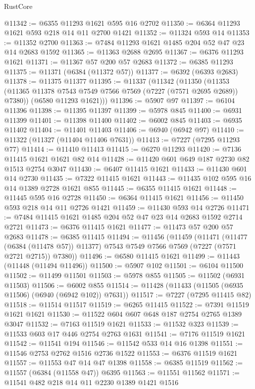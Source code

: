 \begin{lexlean}{RustCore}
\begin{coremodule}
@11342 := @6355 @11293 @1621 @595 @16 @2702
@11350 := @6364 @11293 @1621 @593 @218 @14 @11 @2700 @1421
@11352 := @11324 @593 @14
@11353 := @11352 @2700
@11363 := @7484 @11293 @1621 @1485 @204 @52 @47 @23 @14 @2683 @1592
@11365 := @11363 @2688 @2695
@11367 := @6376 @11293 @1621
@11371 := @11367 @57 @200 @57 @2683
@11372 := @6385 @11293
@11375 := @11371 (@6384 (@11372 @57))
@11377 := @6392 (@6393 @2683)
@11378 := @11375 @11377
@11395 := @11337
    (@11342
      (@11350
        (@11353 (@11365 @11378 @7543 @7549 @7566 @7569 (@7227 (@7571 @2695 @2689)) @7380))
        (@6580 @11293 @1621)))
@11396 := @5907 @97
@11397 := @6104 @11396
@11398 := @11395 @11397
@11399 := @5978 @845
@11400 := @6931 @11399
@11401 := @11398 @11400
@11402 := @6002 @845
@11403 := @6935 @11402
@11404 := @11401 @11403
@11406 := @6940 (@6942 @97)
@11410 := @11322 (@11327 (@11404 @11406 @7631))
@11413 := @7227 (@7295 @11293 @77)
@11414 := @11410 @11413
@11415 := @6270 @11293
@11420 := @7136 @11415 @1621 @1621 @82 @14
@11428 := @11420 @601 @649 @187 @2730 @82 @1513 @2754 @3047
@11430 := @6407 @11415 @1621
@11433 := @11430 @601 @14 @2730
@11435 := @7322 @11415 @1621
@11443 := @11435 @102 @595 @16 @14 @1389 @2728 @1621 @855
@11445 := @6355 @11415 @1621
@11448 := @11445 @595 @16 @2728
@11450 := @6364 @11415 @1621
@11456 := @11450 @593 @218 @14 @11 @2726 @1421
@11459 := @11430 @593 @14 @2726
@11471 := @7484 @11415 @1621 @1485 @204 @52 @47 @23 @14 @2683 @1592 @2714 @2721
@11473 := @6376 @11415 @1621
@11477 := @11473 @57 @200 @57 @2683
@11478 := @6385 @11415
@11494 := @11456
    (@11459
      (@11471
        (@11477 (@6384 (@11478 @57)) @11377)
        @7543
        @7549
        @7566
        @7569
        (@7227 (@7571 @2721 @2715))
        @7380))
@11496 := @6580 @11415 @1621
@11499 := @11443 (@11448 (@11494 @11496))
@11500 := @5907 @102
@11501 := @6104 @11500
@11502 := @11499 @11501
@11503 := @5978 @855
@11505 := @11502 (@6931 @11503)
@11506 := @6002 @855
@11514 := @11428 (@11433 (@11505 (@6935 @11506) (@6940 (@6942 @102)) @7631))
@11517 := @7227 (@7295 @11415 @82)
@11518 := @11514 @11517
@11519 := @6265 @11415
@11522 := @7391 @11519 @1621 @1621
@11530 := @11522 @604 @607 @648 @187 @2754 @2765 @1389 @3047
@11532 := @7163 @11519 @1621
@11533 := @11532 @323
@11539 := @11533 @603 @17 @446 @2754 @2763 @1631
@11541 := @7176 @11519 @1621
@11542 := @11541 @194
@11546 := @11542 @533 @14 @16 @1398
@11551 := @11546 @2753 @2762 @1516 @2736 @1522
@11553 := @6376 @11519 @1621
@11557 := @11553 @47 @14 @47 @1398
@11558 := @6385 @11519
@11562 := @11557 (@6384 (@11558 @47)) @6395
@11563 := @11551 @11562
@11571 := @11541 @482 @218 @14 @11 @2230 @1389 @1421 @1516

\end{coremodule}
\end{lexlean}
